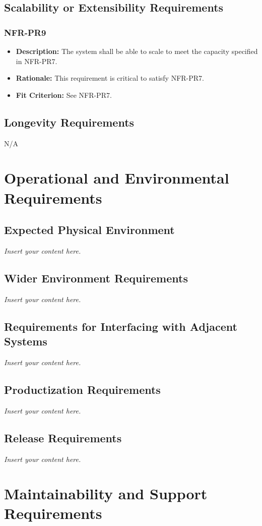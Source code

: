 \documentclass[12pt]{article}
\newcommand{\lips}{\textit{Insert your content here.}}
\begin{document}
\subsection{Scalability or Extensibility Requirements}
\subsubsection*{NFR-PR9}
\begin{itemize}
  \item \textbf{Description:} The system shall be able to scale to meet the capacity specified in NFR-PR7.
  \item \textbf{Rationale:} This requirement is critical to satisfy NFR-PR7.
  \item \textbf{Fit Criterion:} See NFR-PR7.
\end{itemize}
\subsection{Longevity Requirements}
N/A

\section{Operational and Environmental Requirements}
\subsection{Expected Physical Environment}
\lips
\subsection{Wider Environment Requirements}
\lips
\subsection{Requirements for Interfacing with Adjacent Systems}
\lips
\subsection{Productization Requirements}
\lips
\subsection{Release Requirements}
\lips

\section{Maintainability and Support Requirements}
\end{document}
